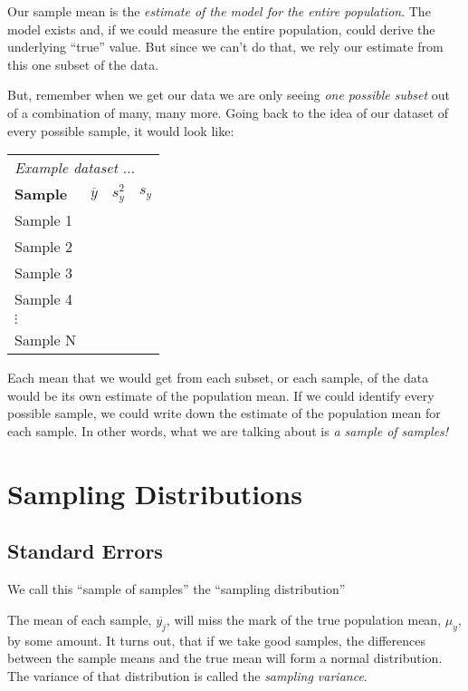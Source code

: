\documentclass[11pt]{lecturenotes}
\begin{document}
Our sample mean is the \emph{estimate of the model for the entire population}. The model exists and, if we could measure the entire population, could derive the underlying ``true'' value. But since we can't do that, we rely our estimate from this one subset of the data. 

But, remember when we get our data we are only seeing \emph{one possible subset} out of a combination of many, many more. Going back to the idea of our dataset of every possible sample, it would look like: 

\begin{table}[!h]
\footnotesize
\begin{tabular}{lrrr}
\multicolumn{4}{l}{\itshape Example dataset $\ldots$ } \\
\textbf{Sample} & $\overline{y}$ & $s^2_y$ & $s_y$ \\\toprule
Sample 1 & & & \\ \midrule
Sample 2 & & & \\  \midrule
Sample 3 & & & \\ \midrule
Sample 4 & & & \\ \midrule
$\vdots$ & & & \\ \midrule
Sample N & & & \\ \bottomrule
\end{tabular}
\end{table}

Each mean that we would get from each subset, or each sample, of the data would be its own estimate of the population mean. If we could identify every possible sample, we could write down the estimate of the population mean for each sample. In other words, what we are talking about is \emph{a sample of samples!}

\section{Sampling Distributions}
\subsection{Standard Errors}

We call this ``sample of samples'' the ``sampling distribution''


The mean of each sample, $\overline{y_j}$, will miss the mark of the true population mean, $\mu_y$, by some amount. It turns out, that if we take good samples, the differences between the sample means and the true mean will form a normal distribution. The variance of that distribution is called the \emph{sampling variance}.
\end{document}
